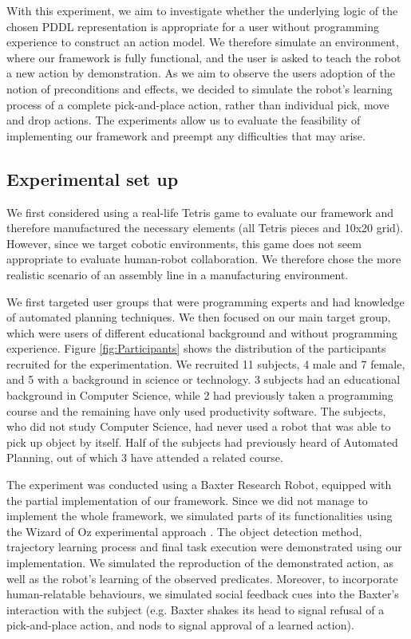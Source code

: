 With this experiment, we aim to investigate whether the underlying logic of the chosen PDDL representation is appropriate for a user without programming experience to construct an action model.
We therefore simulate an environment, where our framework is fully functional, and the user is asked to teach the robot a new action by demonstration. As we aim to observe the users adoption of the notion of preconditions and effects, we decided to simulate the robot's learning process of a complete pick-and-place action, rather than individual pick, move and drop actions. The experiments allow us to evaluate the feasibility of implementing our framework and preempt any difficulties that may arise.

\subsection{Experimental set up}
We first considered using a real-life Tetris game to evaluate our framework and therefore manufactured the necessary elements (all Tetris pieces and 10x20 grid). However, since we target cobotic environments, this game does not seem appropriate to evaluate human-robot collaboration. We therefore chose the more realistic scenario of an assembly line in a manufacturing environment.

We first targeted user groups that were programming experts and had knowledge of automated planning techniques. We then focused on our main target group, which were users of different educational background and without programming experience.
Figure \ref{fig:Participants} shows the distribution of the participants recruited for the experimentation.
We recruited 11 subjects, 4 male and 7 female, and 5 with a background in science or technology. 3 subjects had an educational background in Computer Science, while 2 had previously taken a programming course and the remaining have only used productivity software. The subjects, who did not study Computer Science, had never used a robot that was able to pick up object by itself. Half of the subjects had previously heard of Automated Planning, out of which 3 have attended a related course.

The experiment was conducted using a Baxter Research Robot, equipped with the partial implementation of our framework. Since we did not manage to implement the whole framework, we simulated parts of its functionalities using the Wizard of Oz experimental approach \cite{kelley1985cal}. The object detection method, trajectory learning process and final task execution were demonstrated using our implementation. We simulated the reproduction of the demonstrated action, as well as the robot's learning of the observed predicates. Moreover, to incorporate human-relatable behaviours, we simulated social feedback cues into the Baxter's interaction with the subject (e.g. Baxter shakes its head to signal refusal of a pick-and-place action, and nods to signal approval of a learned action).

